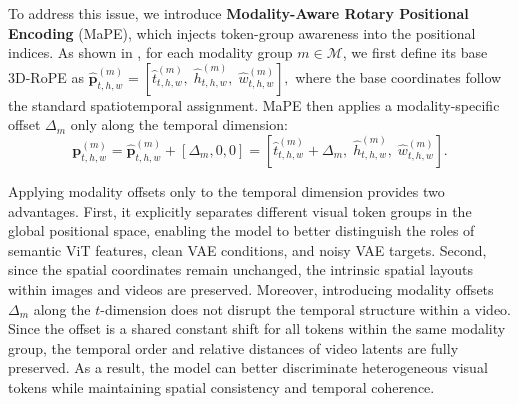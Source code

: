 \documentclass{llmxive}
\begin{document}
To address this issue, we introduce \textbf{Modality-Aware Rotary Positional Encoding} (MaPE),  which injects token-group awareness into the positional indices. As shown in , for each modality group $m \in \mathcal{M}$, we first define its base 3D-RoPE as
$\hat{\mathbf{p}}^{(m)}_{t,h,w}
=
[\hat{t}^{(m)}_{t,h,w},\;
 \hat{h}^{(m)}_{t,h,w},\;
 \hat{w}^{(m)}_{t,h,w}],$
where the base coordinates follow the standard spatiotemporal assignment. MaPE then applies a modality-specific offset $\Delta_m$ only along the temporal dimension:
\begin{equation}
\mathbf{p}^{(m)}_{t,h,w}
=
\hat{\mathbf{p}}^{(m)}_{t,h,w}
+
[\Delta_m, 0, 0]
=
[
\hat{t}^{(m)}_{t,h,w}+\Delta_m,\;
\hat{h}^{(m)}_{t,h,w},\;
\hat{w}^{(m)}_{t,h,w}
].
\end{equation}

Applying modality offsets only to the temporal dimension provides two advantages. First, it explicitly separates different visual token groups in the global positional space, enabling the model to better distinguish the roles of semantic ViT features, clean VAE conditions, and noisy VAE targets. Second, since the spatial coordinates remain unchanged, the intrinsic spatial layouts within images and videos are preserved. 
Moreover, introducing modality offsets $\Delta_m$ along the $t$-dimension does not disrupt the temporal structure within a video. Since the offset is a shared constant shift for all tokens within the same modality group, the temporal order and relative distances of video latents are fully preserved.
As a result, the model can better discriminate heterogeneous visual tokens while maintaining spatial consistency and temporal coherence.







\end{document}
